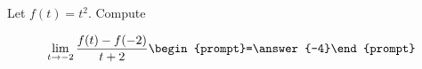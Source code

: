 \documentclass{ximera}
\author{Bart Snapp}
\begin{document}
\begin{exercise}
Let $f(t) = t^2$. Compute

\[
\lim_{ t\to -2 } 
\frac{f(t)-f(-2)}{t+2} \begin{prompt}=\answer{-4}\end{prompt}
\]
\end{exercise}
\end{document}
